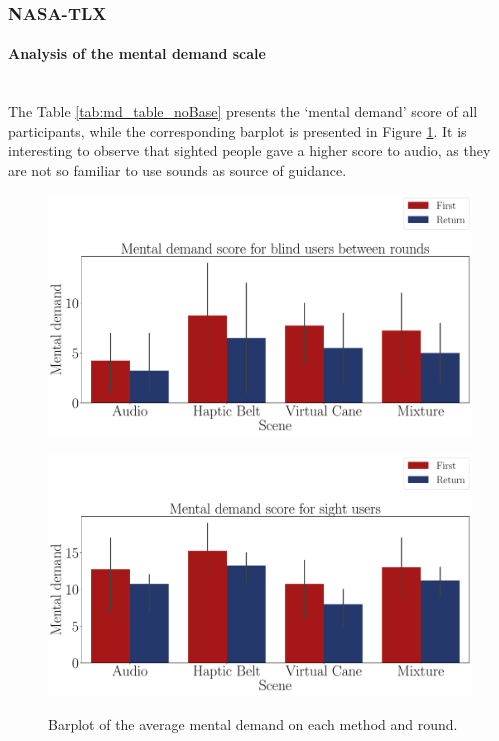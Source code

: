 \subsubsection{NASA-TLX}
\label{subsubsec:results_nasa_tlx_2}

\paragraph{Analysis of the mental demand scale}\mbox{}\\

The Table \ref{tab:md_table_noBase} presents the ‘mental demand’ score of all participants, while the corresponding barplot is presented in Figure \ref{fig:barplot_md_avg_4_scene_blind_sight}. It is interesting to observe that sighted people gave a higher score to audio, as they are not so familiar to use sounds as source of guidance.



\begin{figure}[!htb]
    \centering
    \begin{minipage}{\textwidth}
        \centering
        \includegraphics[width = 0.8\linewidth]{Resultados/Nasa/Figuras/pdf/barplot_md_avg_4_scene_blind.pdf}
        \label{fig:barplot_md_avg_4_scene_blind}
    \end{minipage}
    \begin{minipage}{\textwidth}
        \centering
        \includegraphics[width = 0.8\linewidth]{Resultados/Nasa/Figuras/pdf/barplot_md_avg_4_scene_sight.pdf}
        \label{fig:barplot_md_avg_4_scene_sight}
    \end{minipage}
    \caption{Barplot of the average mental demand on each method and round.}
    \label{fig:barplot_md_avg_4_scene_blind_sight}
\end{figure}


